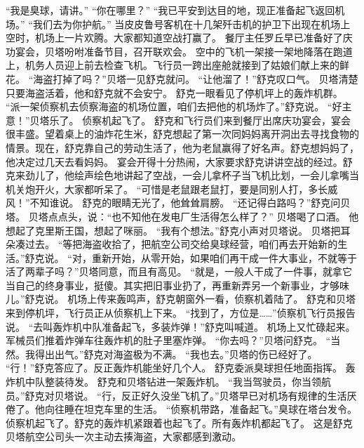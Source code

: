 \documentclass[a4paper,12pt,UTF8,twoside]{ctexbook}
\begin{document}
        “我是臭球，请讲。” 
        “你在哪里？” 
        “我已平安到达目的地，现正准备起飞返回机场。” 
        “我们去为你护航。” 
        当皮皮鲁号客机在十几架歼击机的护卫下出现在机场上空时，机场上一片欢腾。大家都知道空战打赢了。 
        餐厅主任罗丘早已准备好了庆功宴会，贝塔吩咐准备节目，召开联欢会。 
        空中的飞机一架接一架地降落在跑道上，机务人员迎上前去检查飞机。飞行员一跨出座舱就接到了姑娘们献上来的鲜花。 
        “海盗打掉了吗？”贝塔一见舒克就问。 
        “让他溜了！”舒克叹口气。 
        贝塔清楚只要海盗活着，他和舒克就不会安宁。 
        舒克一眼看见了停机坪上的轰炸机群。 
        “派一架侦察机去侦察海盗的机场位置，咱们去把他的机场炸了。”舒克说。 
        “好主意！”贝塔乐了。 
        侦察机起飞了。 
        舒克和飞行员们来到餐厅出席庆功宴会，宴会很丰盛。望着桌上的油炸花生米，舒克想起了第一次同妈妈离开洞出去寻找食物的情景。现在，舒克靠自己的劳动生活了，他为老鼠赢得了好名声。舒克想妈妈了，他决定过几天去看妈妈。 
        宴会开得十分热闹，大家要求舒克讲讲空战的经过。舒克来劲儿了，他绘声绘色地讲起了空战，一会儿拿杯子当飞机比划，一会儿拿嘴当机关炮开火，大家都听呆了。 
        “可惜是老鼠跟老鼠打，要是同别人打，多长威风！”不知谁说。 
        舒克的眼睛无光了，他耸耸肩膀。 
        “还记得白路吗？”舒克问贝塔。 
        贝塔点点头，说：“也不知他在发电厂生活得怎么样了？” 
        贝塔喝了口酒。 
        他想起了克里斯王国，想起了咪丽。 
        “我有个想法。”舒克小声对贝塔说。 
        贝塔把耳朵凑过去。 
        “等把海盗收拾了，把航空公司交给臭球经营，咱们再去开始新的生活。”舒克说。 
        “对，重新开始，从零开始，如果咱们再干成一件大事业，不就等于活了两辈子吗？”贝塔同意，而且有高见。 
        “就是，一般人干成了一件事，就拿它当自己的终身事业，挺傻。其实把旧事业扔了，再重新弄另一个新事业，才够味儿。”舒克说。 
        机场上传来轰鸣声，舒克朝窗外一看，侦察机着陆了。 
        舒克和贝塔来到停机坪，飞行员正从侦察机上下来。 
        “找到了，方位是……”侦察机飞行员报告说。 
        “去叫轰炸机中队准备起飞，多装炸弹！”舒克叫喊道。 
        机场上又忙碌起来。军械员们推着炸弹车往轰炸机的肚子里塞炸弹。 
        “你去吗？”贝塔问舒克。 
        “当然。我得出出气。”舒克对海盗极为不满。 
        “我也去。”贝塔的伤已经好了。 
        “行！”舒克答应了。反正轰炸机能坐好几个人。 
        舒克委派臭球担任地面指挥。 
        轰炸机中队整装待发。 
        舒克和贝塔钻进一架轰炸机。 
        “我当驾驶员，你当领航员。”舒克对贝塔说。 
        “行，反正好久没坐飞机了。”贝塔早已对机场有规律的生活厌倦了。他向往睡在坦克车里的生活。 
        “侦察机带路，准备起飞。”臭球在塔台发令。 
        侦察机起飞了。舒克的轰炸机紧跟着也起飞了。所有轰炸机都起飞了。 
        这是舒克贝塔航空公司头一次主动去揍海盗，大家都感到激动。 
\end{document}
